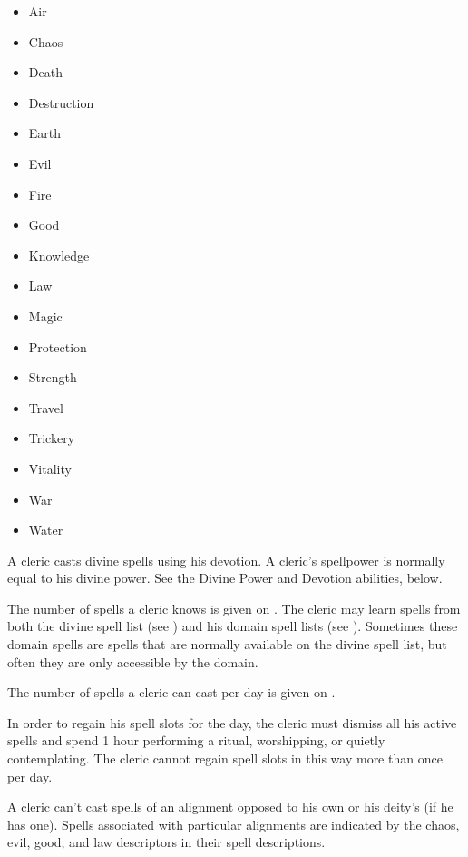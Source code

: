 \begin{itemize}
    \item{Air}
    \item{Chaos}
    \item{Death}
    \item{Destruction}
    \item{Earth}
    \item{Evil}
    \item{Fire}
    \item{Good}
    \item{Knowledge}
    \item{Law}
    \item{Magic}
    \item{Protection}
    \item{Strength}
    \item{Travel}
    \item{Trickery}
    \item{Vitality}
    \item{War}
    \item{Water}
\end{itemize}

A cleric casts divine spells using his devotion.
A cleric's spellpower is normally equal to his divine power.
See the Divine Power and Devotion abilities, below.

The number of spells a cleric knows is given on .
The cleric may learn spells from both the divine spell list (see ) and his domain spell lists (see ).
Sometimes these domain spells are spells that are normally available on the divine spell list, but often they are only accessible by the domain.

The number of spells a cleric can cast per day is given on .

In order to regain his spell slots for the day, the cleric must dismiss all his active spells and spend 1 hour performing a ritual, worshipping, or quietly contemplating.
The cleric cannot regain spell slots in this way more than once per day.

A cleric can't cast spells of an alignment opposed to his own or his deity's (if he has one).
Spells associated with particular alignments are indicated by the chaos, evil, good, and law descriptors in their spell descriptions.

